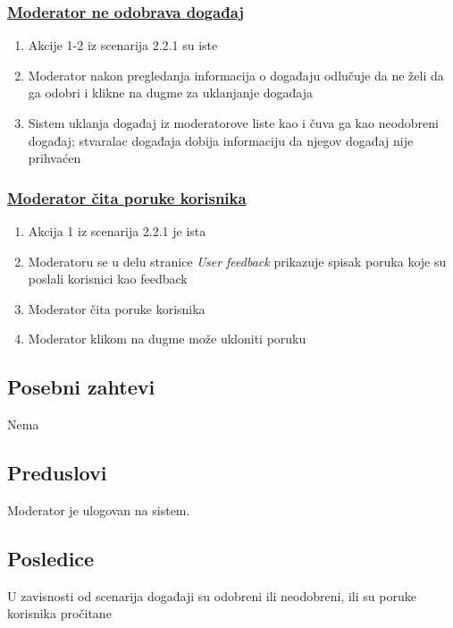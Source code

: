 \documentclass[11pt,a4paper]{article}
\begin{document}
\subsubsection{\underline{Moderator ne odobrava događaj}}
\begin{enumerate}
    \item Akcije 1-2 iz scenarija 2.2.1 su iste
    \item Moderator nakon pregledanja informacija o događaju odlučuje da ne želi da ga odobri i klikne na dugme za uklanjanje događaja
    \item Sistem uklanja događaj iz moderatorove liste kao i čuva ga kao neodobreni događaj; stvaralac događaja dobija informaciju da njegov događaj nije prihvaćen  
\end{enumerate}

\subsubsection{\underline{Moderator čita poruke korisnika}}
\begin{enumerate}
    \item Akcija 1 iz scenarija 2.2.1 je ista
    \item Moderatoru se u delu stranice \textit{User feedback} prikazuje spisak poruka koje su poslali korisnici kao feedback
    \item Moderator čita poruke korisnika
    \item Moderator klikom na dugme može ukloniti poruku
\end{enumerate}

\newpage

\subsection{Posebni zahtevi}
Nema
\subsection{Preduslovi}
Moderator je ulogovan na sistem.
\subsection{Posledice}
U zavisnosti od scenarija događaji su odobreni ili neodobreni, ili su poruke korisnika pročitane
\newpage
\end{document}
